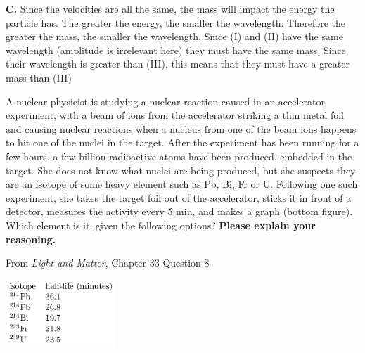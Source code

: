 \documentclass[addpoints,12pt]{exam}
\begin{document}
\begin{questions}
\begin{TheSolution}
\textbf{C.} Since the velocities are all the same, the mass will impact the energy the particle has. The greater the energy, the smaller the wavelength: Therefore the greater the mass, the smaller the wavelength. Since (I) and (II) have the same wavelength (amplitude is irrelevant here) they must have the same mass. Since their wavelength is greater than (III), this means that they must have a greater mass than (III)
\end{TheSolution}

\question[4] A nuclear physicist is studying a nuclear reaction caused in
an accelerator experiment, with a beam of ions from the accelerator
striking a thin metal foil and causing nuclear reactions when a nucleus from one of the beam ions happens to hit one of the nuclei in
the target. After the experiment has been running for a few hours,
a few billion radioactive atoms have been produced, embedded in
the target. She does not know what nuclei are being produced, but
she suspects they are an isotope of some heavy element such as Pb,
Bi, Fr or U. Following one such experiment, she takes the target foil
out of the accelerator, sticks it in front of a detector, measures the
activity every 5 min, and makes a graph (bottom figure). Which element is it, given the following options? \textbf{Please explain your reasoning.}

From \textit{Light and Matter}, Chapter 33 Question 8


\includegraphics[height=1in]{../images/Isotopes.png}


\end{questions}
\end{document}
